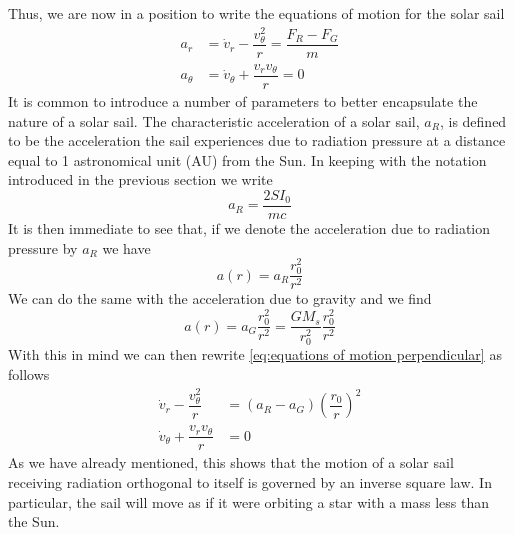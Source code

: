 \documentclass[twocolumn,12pt,a4paper]{article}
\numberwithin{equation}{section}
\begin{document}
Thus, we are now in a position to write the equations of motion for the solar sail
\begin{align}
	a_{r} &= \dot{v}_r - \dfrac{v_{\theta}^2}{r} = \dfrac{F_R - F_G}{m} \label{eq:equations of motion perpendicular} \\
	a_{\theta} &= \dot{v}_{\theta} + \dfrac{v_r v_{\theta}}{r} = 0 
\end{align}
It is common to introduce a number of parameters to better encapsulate the nature of a solar sail. The characteristic acceleration of a solar sail, \( a_R \), is defined to be the acceleration the sail experiences due to radiation pressure at a distance equal to 1 astronomical unit (AU) from the Sun. In keeping with the notation introduced in the previous section we write
\begin{equation} \label{eq:characterisit acceleration}
  a_R = \dfrac{2SI_0}{mc}
\end{equation}
It is then immediate to see that, if we denote the acceleration due to radiation pressure by \( a_R \) we have
\begin{equation}
  a(r) = a_R \dfrac{r_0^2}{r^2} 
\end{equation}
We can do the same with the acceleration due to gravity and we find
\begin{equation}
  a(r) = a_G \dfrac{r_0^2}{r^2} = \dfrac{G M_s}{r_0^2} \dfrac{r_0^2}{r^2}
\end{equation}
With this in mind we can then rewrite \autoref{eq:equations of motion perpendicular} as follows
\begin{align} \label{eq:equations of motion characteristic accelerations}
  \dot{v}_r - \dfrac{v_{\theta}^2}{r} &= (a_R - a_G) \left(\dfrac{r_0}{r}\right)^2 \\
	\dot{v}_{\theta} + \dfrac{v_r v_{\theta}}{r} &= 0
\end{align}
As we have already mentioned, this shows that the motion of a solar sail receiving radiation orthogonal to itself is governed by an inverse square law. In particular, the sail will move as if it were orbiting a star with a mass less than the Sun.
\end{document}
